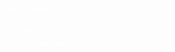 \begin{titlepage}
\begin{sffamily}
\pagecolor{black}
\begin{spacing}{2.0}
{\fontsize{65}{90}\selectfont \textcolor{white}{\\Настольная\\книга\\анонима}}\\
\Large \textcolor{white}{Зачем нужна анонимность и как её достичь?}
\vfill
\begin{figure}[h]
\end{figure}
\end{spacing}
\end{sffamily}
\end{titlepage}
\pagecolor{white}
